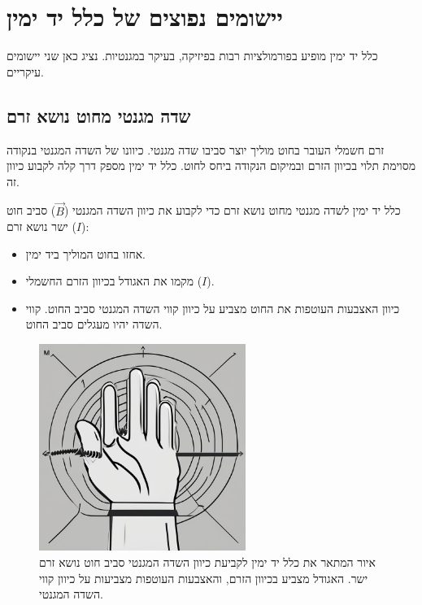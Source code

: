 \documentclass[12pt]{article}
\begin{document}
\section{יישומים נפוצים של כלל יד ימין}

כלל יד ימין מופיע בפורמולציות רבות בפיזיקה, בעיקר במגנטיות. נציג כאן שני יישומים עיקריים.

\subsection{שדה מגנטי מחוט נושא זרם}

זרם חשמלי העובר בחוט מוליך יוצר סביבו שדה מגנטי. כיוונו של השדה המגנטי בנקודה מסוימת תלוי בכיוון הזרם ובמיקום הנקודה ביחס לחוט. כלל יד ימין מספק דרך קלה לקבוע כיוון זה.

\begin{definitionBox}{כלל יד ימין לשדה מגנטי מחוט נושא זרם}
כדי לקבוע את כיוון השדה המגנטי (\( \vec{B} \)) סביב חוט ישר נושא זרם (\( I \)):
\begin{itemize}
    \item אחזו בחוט המוליך ביד ימין.
    \item מקמו את האגודל בכיוון הזרם החשמלי (\( I \)).
    \item כיוון האצבעות העוטפות את החוט מצביע על כיוון קווי השדה המגנטי סביב החוט. קווי השדה יהיו מעגלים סביב החוט.
\end{itemize}
\end{definitionBox}

\begin{figure}[H]
  \centering
  \includegraphics[width=0.6\textwidth]{files/right_hand_rule_diagram.png}
  \caption{איור המתאר את כלל יד ימין לקביעת כיוון השדה המגנטי סביב חוט נושא זרם ישר. האגודל מצביע בכיוון הזרם, והאצבעות העוטפות מצביעות על כיוון קווי השדה המגנטי.}
\end{figure}
\end{document}
